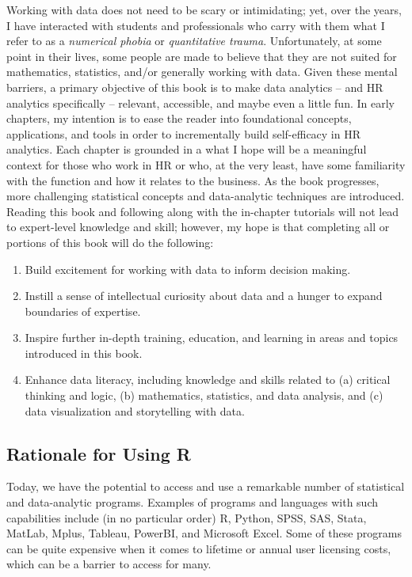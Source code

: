 \documentclass[]{book}
\providecommand{\tightlist}{%
  \setlength{\itemsep}{0pt}\setlength{\parskip}{0pt}}
\begin{document}
Working with data does not need to be scary or intimidating; yet, over
the years, I have interacted with students and professionals who carry
with them what I refer to as a \emph{numerical phobia} or
\emph{quantitative trauma}. Unfortunately, at some point in their lives,
some people are made to believe that they are not suited for
mathematics, statistics, and/or generally working with data. Given these
mental barriers, a primary objective of this book is to make data
analytics -- and HR analytics specifically -- relevant, accessible, and
maybe even a little fun. In early chapters, my intention is to ease the
reader into foundational concepts, applications, and tools in order to
incrementally build self-efficacy in HR analytics. Each chapter is
grounded in a what I hope will be a meaningful context for those who
work in HR or who, at the very least, have some familiarity with the
function and how it relates to the business. As the book progresses,
more challenging statistical concepts and data-analytic techniques are
introduced. Reading this book and following along with the in-chapter
tutorials will not lead to expert-level knowledge and skill; however, my
hope is that completing all or portions of this book will do the
following:

\begin{enumerate}
\def\labelenumi{\arabic{enumi}.}
\tightlist
\item
  Build excitement for working with data to inform decision making.
\item
  Instill a sense of intellectual curiosity about data and a hunger to
  expand boundaries of expertise.
\item
  Inspire further in-depth training, education, and learning in areas
  and topics introduced in this book.
\item
  Enhance data literacy, including knowledge and skills related to (a)
  critical thinking and logic, (b) mathematics, statistics, and data
  analysis, and (c) data visualization and storytelling with data.
\end{enumerate}

\subsection{Rationale for Using R}\label{rationalerpref}

Today, we have the potential to access and use a remarkable number of
statistical and data-analytic programs. Examples of programs and
languages with such capabilities include (in no particular order) R,
Python, SPSS, SAS, Stata, MatLab, Mplus, Tableau, PowerBI, and Microsoft
Excel. Some of these programs can be quite expensive when it comes to
lifetime or annual user licensing costs, which can be a barrier to
access for many.
\end{document}
